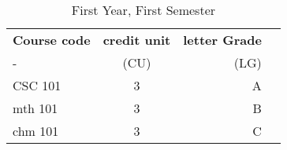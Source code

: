 \documentclass{article}
\begin{document}
	\begin{table}[h!]
		\begin{center}
			\caption{First Year, First Semester}
			\label{tab:table1}
			\begin{tabular}{l|c|r|c}
				\textbf{Course code} & \textbf{credit unit} & \textbf{letter Grade}\\ - & (CU) & (LG)\\
				CSC 101 & 3 & A\\
				mth 101 & 3 & B\\
				chm 101 & 3 & C\\
			\end{tabular}
		\end{center}
	\end{table}
\end{document}
